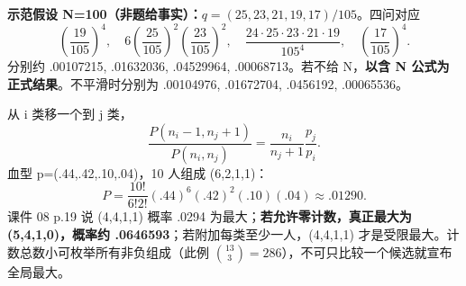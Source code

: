 \textbf{示范假设 N=100（非题给事实）：}$q=(25,23,21,19,17)/105$。四问对应
\[
\left(\frac{19}{105}\right)^4,\quad
6\left(\frac{25}{105}\right)^2\left(\frac{23}{105}\right)^2,\quad
\frac{24\cdot25\cdot23\cdot21\cdot19}{105^4},\quad
\left(\frac{17}{105}\right)^4.
\]
分别约 .00107215, .01632036, .04529964, .00068713。若不给 N，\textbf{以含 N 公式为正式结果}。不平滑时分别为 .00104976, .01672704, .0456192, .00065536。

从 i 类移一个到 j 类，
\[
\frac{P(n_i-1,n_j+1)}{P(n_i,n_j)}=\frac{n_i}{n_j+1}\frac{p_j}{p_i}.
\]
血型 p=(.44,.42,.10,.04)，10 人组成 (6,2,1,1)：
\[
P=\frac{10!}{6!2!}(.44)^6(.42)^2(.10)(.04)\approx .01290.
\]
课件 08 p.19 说 (4,4,1,1) 概率 .0294 为最大；\textbf{若允许零计数，真正最大为 (5,4,1,0)，概率约 .0646593}；若附加每类至少一人，(4,4,1,1) 才是受限最大。计数总数小可枚举所有非负组成（此例 $\binom{13}3=286$），不可只比较一个候选就宣布全局最大。
